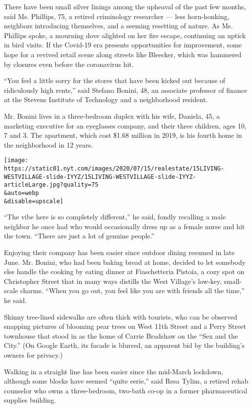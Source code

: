 There have been small silver linings among the upheaval of the past few
months, said Ms. Phillips, 75, a retired criminology researcher --- less
horn-honking, neighbors introducing themselves, and a seeming resetting
of nature. As Ms. Phillips spoke, a mourning dove alighted on her fire
escape, continuing an uptick in bird visits. If the Covid-19 era
presents opportunities for improvement, some hope for a revived retail
scene along streets like Bleecker, which was hammered by closures even
before the coronavirus hit.

``You feel a little sorry for the stores that have been kicked out
because of ridiculously high rents,'' said Stefano Bonini, 48, an
associate professor of finance at the Stevens Institute of Technology
and a neighborhood resident.

Mr. Bonini lives in a three-bedroom duplex with his wife, Daniela, 45, a
marketing executive for an eyeglasses company, and their three children,
ages 10, 7 and 3. The apartment, which cost \$1.68 million in 2019, is
his fourth home in the neighborhood in 12 years.

\texttt{[image: https://static01.nyt.com/images/2020/07/15/realestate/15LIVING-WESTVILLAGE-slide-IYYZ/15LIVING-WESTVILLAGE-slide-IYYZ-articleLarge.jpg?quality=75\\\&auto=webp\\\&disable=upscale]}

``The vibe here is so completely different,'' he said, fondly recalling
a male neighbor he once had who would occasionally dress up as a female
nurse and hit the town. ``There are just a lot of genuine people.''

Enjoying their company has been easier since outdoor dining resumed in
late June. Mr. Bonini, who had been baking bread at home, decided to let
somebody else handle the cooking by eating dinner at Fiaschetteria
Pistoia, a cozy spot on Christopher Street that in many ways distills
the West Village's low-key, small-scale charms. ``When you go out, you
feel like you are with friends all the time,'' he said.

Skinny tree-lined sidewalks are often thick with tourists, who can be
observed snapping pictures of blooming pear trees on West 11th Street
and a Perry Street townhouse that stood in as the home of Carrie
Bradshaw on the ``Sex and the City.'' (On Google Earth, its facade is
blurred, an apparent bid by the building's owners for privacy.)

Walking in a straight line has been easier since the mid-March lockdown,
although some blocks have seemed ``quite eerie,'' said Resa Tylim, a
retired rehab counselor who owns a three-bedroom, two-bath co-op in a
former pharmaceutical supplies building.

